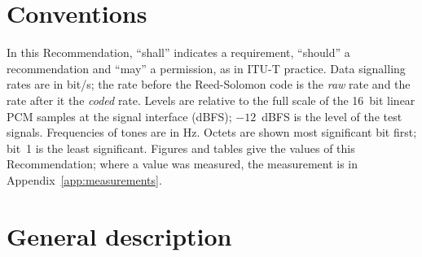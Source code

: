 \documentclass[a4paper,11pt]{article}
\begin{document}
\section{Conventions}
In this Recommendation, ``shall'' indicates a requirement, ``should'' a
recommendation and ``may'' a permission, as in ITU-T practice.  Data
signalling rates are in bit/s; the rate before the Reed-Solomon code is
the \emph{raw} rate and the rate after it the \emph{coded} rate.  Levels
are relative to the full scale of the 16~bit linear PCM samples at the
signal interface (dBFS); $-12$~dBFS is the level of the test signals.
Frequencies of tones are in Hz.  Octets are shown most significant bit
first; bit~1 is the least significant.\label{sec:conventions}  Figures and tables give the
values of this Recommendation; where a value was measured, the
measurement is in Appendix~\ref{app:measurements}.

\section{General description}\label{sec:general}
\end{document}
